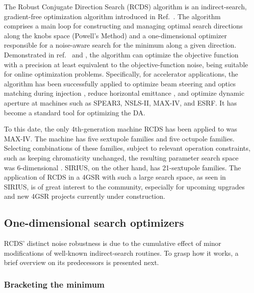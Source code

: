 The Robust Conjugate Direction Search (RCDS) algorithm is an indirect-search, gradient-free optimization algorithm introduced in Ref.~\cite{huang_algorithm_2013}. The algorithm comprises a main loop for constructing and managing optimal search directions along the knobs space (Powell's Method) and a one-dimensional optimizer responsible for a noise-aware search for the minimum along a given direction. Demonstrated in ref.~\cite{huang_algorithm_2013} and \cite[section 7.3.3]{huang_beam-based_2019}, the algorithm can optimize the objective function with a precision at least equivalent to the objective-function noise, being suitable for online optimization problems. Specifically, for accelerator applications, the algorithm has been successfully applied to optimize beam steering and optics matching during injection \cite{huang_algorithm_2013}, reduce horizontal emittance \cite{huang_algorithm_2013, huang_online_2015}, and optimize dynamic aperture \cite{huang_algorithm_2013, huang_online_2015,liuzzo_rcds_2016,olsson_online_2018,yang_online_2022} at machines such as SPEAR3, NSLS-II, MAX-IV, and ESRF. It has become a standard tool for optimizing the DA.

To this date, the only 4th-generation machine RCDS has been applied to was MAX-IV. The machine has five sextupole families and five octupole families. Selecting combinations of these families, subject to relevant operation constraints, such as keeping chromaticity unchanged, the resulting parameter search space was 6-dimensional \cite{olsson_online_2018}. SIRIUS, on the other hand, has 21-sextupole families. The application of RCDS in a 4GSR with such a large search space, as seen in SIRIUS, is of great interest to the community, especially for upcoming upgrades and new 4GSR projects currently under construction.

\subsection{One-dimensional search optimizers}
RCDS' distinct noise robustness is due to the cumulative effect of minor modifications of well-known indirect-search routines. To grasp how it works, a brief overview on its predecessors is presented next.
\subsubsection{Bracketing the minimum}


